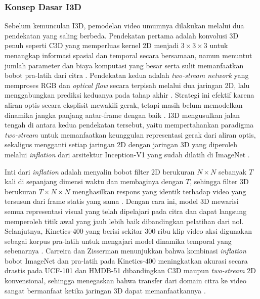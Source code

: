 \subsubsection{Konsep Dasar I3D} \label{II.I3D.1}
Sebelum kemunculan I3D, pemodelan video umumnya dilakukan melalui dua pendekatan yang saling berbeda. Pendekatan pertama adalah konvolusi 3D penuh seperti C3D yang memperluas kernel 2D menjadi $3 \times 3 \times 3$ untuk menangkap informasi spasial dan temporal secara bersamaan, namun menuntut jumlah parameter dan biaya komputasi yang besar serta sulit memanfaatkan bobot pra-latih dari citra \cite{Tran2015}. Pendekatan kedua adalah \textit{two-stream network} yang memproses RGB dan \textit{optical flow} secara terpisah melalui dua jaringan 2D, lalu menggabungkan prediksi keduanya pada tahap akhir \cite{Simonyan2014TwoStream}. Strategi ini efektif karena aliran optis secara eksplisit mewakili gerak, tetapi masih belum memodelkan dinamika jangka panjang antar-frame dengan baik \cite{Simonyan2014TwoStream,Carreira2017I3D}. I3D mengusulkan jalan tengah di antara kedua pendekatan tersebut, yaitu mempertahankan paradigma \textit{two-stream} untuk memanfaatkan keunggulan representasi gerak dari aliran optis, sekaligus mengganti setiap jaringan 2D dengan jaringan 3D yang diperoleh melalui \textit{inflation} dari arsitektur Inception-V1 yang sudah dilatih di ImageNet \cite{Carreira2017I3D}.\par

Inti dari \textit{inflation} adalah menyalin bobot filter 2D berukuran $N \times N$ sebanyak $T$ kali di sepanjang dimensi waktu dan membaginya dengan $T$, sehingga filter 3D berukuran $T \times N \times N$ menghasilkan respons yang identik terhadap video yang tersusun dari frame statis yang sama \cite{Carreira2017I3D}. Dengan cara ini, model 3D mewarisi semua representasi visual yang telah dipelajari pada citra dan dapat langsung memperoleh titik awal yang jauh lebih baik dibandingkan pelatihan dari nol. Selanjutnya, Kinetics-400 yang berisi sekitar 300 ribu klip video aksi digunakan sebagai korpus pra-latih untuk mengajari model dinamika temporal yang sebenarnya \cite{Carreira2017I3D}. Carreira dan Zisserman menunjukkan bahwa kombinasi \textit{inflation} bobot ImageNet dan pra-latih pada Kinetics-400 meningkatkan akurasi secara drastis pada UCF-101 dan HMDB-51 dibandingkan C3D maupun \textit{two-stream} 2D konvensional, sehingga menegaskan bahwa transfer dari domain citra ke video sangat bermanfaat ketika jaringan 3D dapat memanfaatkannya \cite{Carreira2017I3D}.\par

